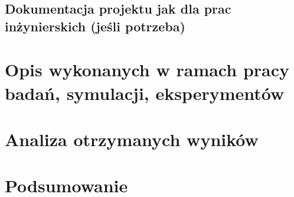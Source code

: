 \documentclass{wfiisul}
\begin{document}
\section{Dokumentacja projektu jak dla prac inżynierskich (jeśli potrzeba)}
\chapter{Opis wykonanych w ramach pracy badań, symulacji, eksperymentów}
\chapter{Analiza otrzymanych wyników}
\chapter{Podsumowanie}

\listoftables
\listoffigures

\end{document}
